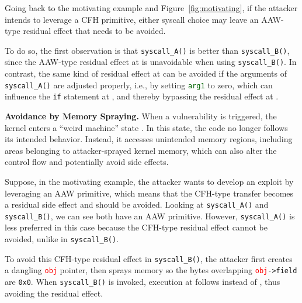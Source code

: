Going back to the motivating example and Figure~\ref{fig:motivating}, if the attacker intends to leverage a CFH primitive, either syscall choice may leave an AAW-type residual effect that needs to be avoided.

To do so, the first observation is that \texttt{syscall\_A()} is better than \texttt{syscall\_B()}, since the AAW-type residual effect at  is unavoidable when using \texttt{syscall\_B()}. In contrast, the same kind of residual effect at  can be avoided if the arguments of \texttt{syscall\_A()} are adjusted properly, i.e., by setting \textcolor{DarkGreen}{\texttt{arg1}} to zero, which can influence the \texttt{if} statement at , and thereby bypassing the residual effect at .

\vspace{0.015in}
\noindent\textbf{Avoidance by Memory Spraying.}
When a vulnerability is triggered, the kernel enters a ``weird machine'' state \cite{weirdmachine}. In this state, the code no longer follows its intended behavior. Instead, it accesses unintended memory regions, including areas belonging to attacker-sprayed kernel memory, which can also alter the control flow and potentially avoid side effects.

Suppose, in the motivating example, the attacker wants to develop an exploit by leveraging an AAW primitive, which means that the CFH-type transfer becomes a residual side effect and should be avoided. Looking at \texttt{syscall\_A()} and \texttt{syscall\_B()}, we can see both have an AAW primitive. However, \texttt{syscall\_A()} is less preferred in this case because the CFH-type residual effect cannot be avoided, unlike in \texttt{syscall\_B()}.


To avoid this CFH-type residual effect in \texttt{syscall\_B()}, the attacker first creates a dangling \textcolor{red}{\texttt{obj}} pointer, then sprays memory so the bytes overlapping \textcolor{red}{\texttt{obj}}\texttt{->field} are \texttt{0x0}. When \texttt{syscall\_B()} is invoked, execution at  follows  instead of , thus avoiding the residual effect.




